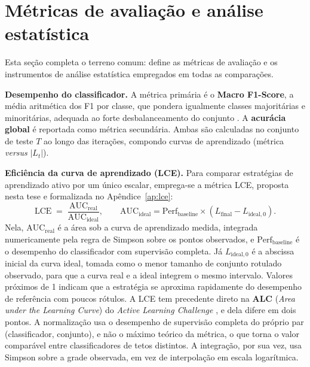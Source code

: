 \section{Métricas de avaliação e análise estatística}
\label{sec:metodo-metricas}

Esta seção completa o terreno comum: define as métricas de avaliação e os
instrumentos de análise estatística empregados em todas as comparações.

\textbf{Desempenho do classificador.} A métrica primária é o \textbf{Macro
F1-Score}, a média aritmética dos F1 por classe, que pondera igualmente classes
majoritárias e minoritárias, adequada ao forte desbalanceamento do conjunto
\citep{Sokolova2009}. A \textbf{acurácia global} é reportada como métrica
secundária. Ambas são calculadas no conjunto de teste $T$ ao longo das iterações,
compondo curvas de aprendizado (métrica \textit{versus} $|L_t|$).

\textbf{Eficiência da curva de aprendizado (LCE).} Para comparar estratégias de
aprendizado ativo por um único escalar, emprega-se a métrica LCE, proposta nesta
tese e formalizada no Apêndice~\ref{ap:lce}:
\begin{equation}
  \mathrm{LCE} \;=\; \frac{\mathrm{AUC}_{\mathrm{real}}}{\mathrm{AUC}_{\mathrm{ideal}}},
  \qquad
  \mathrm{AUC}_{\mathrm{ideal}} = \mathrm{Perf}_{\mathrm{baseline}} \times (L_{\mathrm{final}} - L_{\mathrm{ideal},0}).
  \label{eq:metodo-lce}
\end{equation}
Nela, $\mathrm{AUC}_{\mathrm{real}}$ é a área sob a curva de aprendizado medida,
integrada numericamente pela regra de Simpson sobre os pontos observados, e
$\mathrm{Perf}_{\mathrm{baseline}}$ é o desempenho do classificador com supervisão
completa. Já $L_{\mathrm{ideal},0}$ é a abscissa inicial da curva ideal, tomada
como o menor tamanho de conjunto rotulado observado, para que a curva real e a
ideal integrem o mesmo intervalo. Valores próximos de 1 indicam que a estratégia
se aproxima rapidamente do desempenho de referência com poucos rótulos. A LCE tem precedente
direto na \textbf{ALC} (\textit{Area under the Learning Curve}) do
\textit{Active Learning Challenge} \citep{Guyon2011ALC}, e dela difere em dois
pontos. A normalização usa o desempenho de supervisão completa do próprio par
(classificador, conjunto), e não o máximo teórico da métrica, o que torna o valor
comparável entre classificadores de tetos distintos. A integração, por sua vez,
usa Simpson
sobre a grade observada, em vez de interpolação em escala logarítmica.

